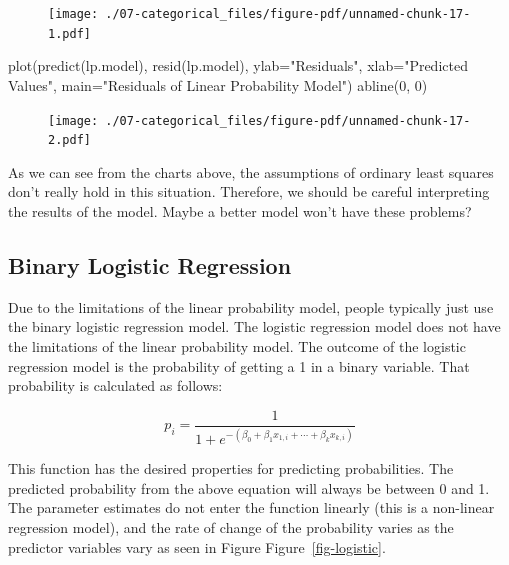 \documentclass[
  letterpaper,
  DIV=11,
  numbers=noendperiod]{scrreprt}
\newenvironment{Shaded}{\begin{snugshade}}{\end{snugshade}}
\newcommand{\AttributeTok}[1]{\textcolor[rgb]{0.40,0.45,0.13}{#1}}
\newcommand{\DecValTok}[1]{\textcolor[rgb]{0.68,0.00,0.00}{#1}}
\newcommand{\FunctionTok}[1]{\textcolor[rgb]{0.28,0.35,0.67}{#1}}
\newcommand{\NormalTok}[1]{\textcolor[rgb]{0.00,0.23,0.31}{#1}}
\newcommand{\StringTok}[1]{\textcolor[rgb]{0.13,0.47,0.30}{#1}}
\begin{document}
\begin{figure}[H]

{\centering \texttt{[image: ./07-categorical\_files/figure-pdf/unnamed-chunk-17-1.pdf]}

}

\end{figure}

\begin{Shaded}
\begin{Highlighting}[]
\FunctionTok{plot}\NormalTok{(}\FunctionTok{predict}\NormalTok{(lp.model), }\FunctionTok{resid}\NormalTok{(lp.model), }
     \AttributeTok{ylab=}\StringTok{"Residuals"}\NormalTok{, }\AttributeTok{xlab=}\StringTok{"Predicted Values"}\NormalTok{, }
     \AttributeTok{main=}\StringTok{"Residuals of Linear Probability Model"}\NormalTok{) }
\FunctionTok{abline}\NormalTok{(}\DecValTok{0}\NormalTok{, }\DecValTok{0}\NormalTok{) }
\end{Highlighting}
\end{Shaded}

\begin{figure}[H]

{\centering \texttt{[image: ./07-categorical\_files/figure-pdf/unnamed-chunk-17-2.pdf]}

}

\end{figure}

As we can see from the charts above, the assumptions of ordinary least
squares don't really hold in this situation. Therefore, we should be
careful interpreting the results of the model. Maybe a better model
won't have these problems?

\hypertarget{binary-logistic-regression}{%
\subsection{Binary Logistic
Regression}\label{binary-logistic-regression}}

Due to the limitations of the linear probability model, people typically
just use the binary logistic regression model. The logistic regression
model does not have the limitations of the linear probability model. The
outcome of the logistic regression model is the probability of getting a
1 in a binary variable. That probability is calculated as follows:

\[
p_i = \frac{1}{1+e^{-(\beta_0 + \beta_1x_{1,i} + \cdots + \beta_k x_{k,i})}}
\]

This function has the desired properties for predicting probabilities.
The predicted probability from the above equation will always be between
0 and 1. The parameter estimates do not enter the function linearly
(this is a non-linear regression model), and the rate of change of the
probability varies as the predictor variables vary as seen in Figure
Figure~\ref{fig-logistic}.
\end{document}
